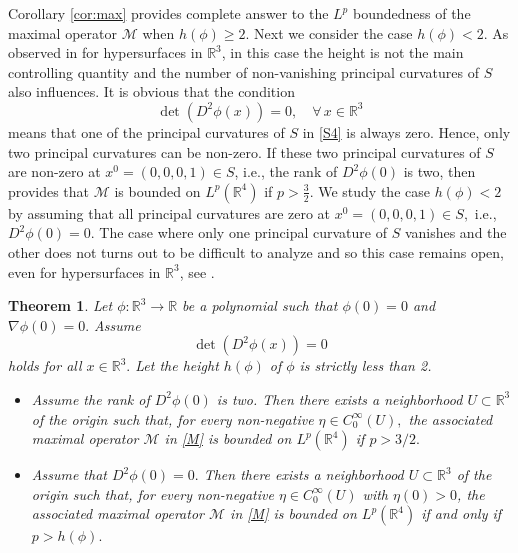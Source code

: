 \documentclass[a4paper, 11pt]{article}
\theoremstyle{plain}
\newtheorem{theorem}{Theorem}[section]
\theoremstyle{definition}
\theoremstyle{lemma}
\theoremstyle{Remark}
\theoremstyle{proposition}
\theoremstyle{corollary}
\newtheorem{corollary}[theorem]{Corollary}
\theoremstyle{example}
\theoremstyle{assumption}
\begin{document}
  Corollary \ref{cor:max} provides complete answer to the $L^p$ boundedness of the maximal operator $\mathcal{M}$ when $h(\phi)\geq 2.$ Next we consider the case $h(\phi)< 2.$ As observed in \cite{P1, P2} for hypersurfaces in $\mathbb{R}^3$, in this case the height is not the main controlling quantity and  the number of non-vanishing principal curvatures of $S$ also influences.  It is obvious that the condition $$\det(D^2\phi(x))=0, \,\,\,\,\,\, \forall\,x\in \mathbb{R}^3$$ means that one of the principal curvatures of  $S$ in \eqref{S4} is always zero. Hence, only two principal curvatures can be non-zero. If these two principal curvatures of $S$ are non-zero at $x^0=(0,0,0,1)\in S$, i.e., the rank of $D^2\phi (0)$ is two, then \cite[Theorem 2]{Gr} provides that  $\mathcal{M}$ is bounded on $L^p(\mathbb{R}^4)$ if  $p>\frac{3}{2}.$  We study the case  $h(\phi)< 2$ by assuming that  all principal curvatures are zero at $x^0=(0,0,0,1)\in S,$ i.e., $D^2\phi (0)=0.$ The case where only one principal curvature of $S$ vanishes and the other does not turns out to be difficult to analyze and so this case remains open, even for hypersurfaces in $\mathbb{R}^3$, see \cite{P2}.
  \begin{theorem}\label{th:h<2}
  Let $\phi:\mathbb{R}^3\to \mathbb{R}$ be a polynomial such that $\phi(0)=0$ and $\nabla\phi(0)=0.$ Assume
$$\det(D^2\phi(x))=0$$
holds for all $x\in \mathbb{R}^3.$ Let the height $h(\phi) $ of $\phi$ is strictly less than 2.
\begin{itemize}
\item[(i)] Assume the rank of $D^2\phi(0)$ is two. Then there exists a neighborhood $U\subset \mathbb{R}^3$ of the origin such that, for every non-negative $\eta\in C^{\infty}_0(U),$ the associated maximal operator $\mathcal{M}$ in \eqref{M} is bounded
on  $L^p(\mathbb{R}^4)$  if  $p>3/2.$
\item[(ii)] Assume that  $D^2\phi(0)=0.$  Then there exists a neighborhood $U\subset \mathbb{R}^3$ of the origin such that, for every non-negative $\eta\in C^{\infty}_0(U)$ with $\eta(0)>0$, the associated maximal operator $\mathcal{M}$  in \eqref{M} is bounded
on  $L^p(\mathbb{R}^4)$ if and only if  $p> h(\phi).$
\end{itemize}
  \end{theorem}
\end{document}
